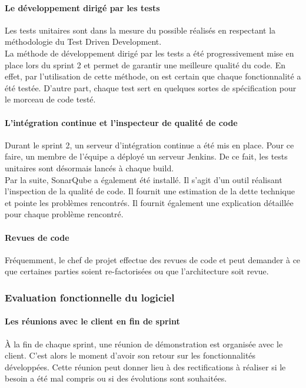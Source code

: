 \paragraph*{Le développement dirigé par les tests\\}
Les tests unitaires sont dans la mesure du possible réalisés en respectant la méthodologie du Test Driven Development.\\
La méthode de développement dirigé par les tests a été progressivement mise en place lors du sprint 2 et permet de garantir une meilleure qualité du code. En effet, par l'utilisation de cette méthode, on est certain que chaque fonctionnalité a été testée. D'autre part, chaque test sert en quelques sortes de spécification pour le morceau de code testé.

\paragraph*{L'intégration continue et l'inspecteur de qualité de code\\} 
Durant le sprint 2, un serveur d'intégration continue a été mis en place. Pour ce faire, un membre de l'équipe a déployé un serveur Jenkins. De ce fait, les tests unitaires sont désormais lancés à chaque build. \\
Par la suite, SonarQube a également été installé. Il s'agit d'un outil réalisant l'inspection de la qualité de code. Il fournit une estimation de la dette technique et pointe les problèmes rencontrés. Il fournit également une explication détaillée pour chaque problème rencontré.

\paragraph{Revues de code\\}
Fréquemment, le chef de projet effectue des revues de code et peut demander à ce que certaines parties soient re-factorisées ou que l'architecture soit revue.

\subsubsection{Evaluation fonctionnelle du logiciel}
\paragraph*{Les réunions avec le client en fin de sprint\\}
À la fin de chaque sprint, une réunion de démonstration est organisée avec le client. C'est alors le moment d'avoir son retour sur les fonctionnalités développées. Cette réunion peut donner lieu à des rectifications à réaliser si le besoin a été mal compris ou si des évolutions sont souhaitées. \\

